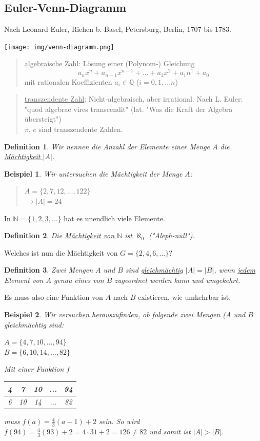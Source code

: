 \documentclass{report}
\newtheorem{mydef}{Definition}
\newtheorem{myexample}{Beispiel}
\begin{document}
\subsection{Euler-Venn-Diagramm}
Nach Leonard Euler, Riehen b. Basel, Petersburg, Berlin, 1707 bis 1783.
\begin{center}\texttt{[image: img/venn-diagramm.png]}\end{center}
\begin{quote}\underline{algebraische Zahl}: Lösung einer (Polynom-) Gleichung \begin{equation}
a_nx^n + a_{n-1}x^{n-1} + ... + a_2x^2 + a_1n^1 + a_0\end{equation}
mit rationalen Koeffizienten $a_i \in \mathbb{Q}$ ($i = 0,1,...n$)\end{quote}
\begin{quote}\underline{transzendente Zahl}: Nicht-algebraisch, aber irrational. Nach L. Euler: "quod algebrae vires transcendit" (lat. "Was die Kraft der Algebra übersteigt")\\
$\pi$, $e$ sind transzendente Zahlen.\end{quote}
\begin{mydef}Wir nennen die Anzahl der Elemente einer Menge $A$ die \underline{Mächtigkeit $|A|$}. \end{mydef}
\begin{myexample}Wir untersuchen die Mächtigkeit der Menge $A$:
\begin{quote}$A = \{2, 7, 12, ..., 122\}$\\
$\to |A| = 24$\end{quote}\end{myexample}
In $\mathbb{N} = \{1, 2, 3, ... \}$ hat es unendlich viele Elemente.
\begin{mydef} Die \underline{Mächtigkeit von $\mathbb{N}$} ist $\aleph_0$ ("Aleph-null").\end{mydef}
Welches ist nun die Mächtigkeit von $G = \{2, 4, 6, ...\}$?
\begin{mydef}Zwei Mengen $A$ und $B$ sind \underline{gleichmächtig} $|A| = |B|$, wenn \underline{jedem} Element von $A$ genau eines von $B$ zugeordnet werden kann und umgekehrt.\end{mydef}
Es muss also eine Funktion von $A$ nach $B$ existieren, wie umkehrbar ist.
\begin{myexample}Wir versuchen herauszufinden, ob folgende zwei Mengen ($A$ und $B$ gleichmächtig sind:\begin{center}
$A = \{4, 7, 10, ..., 94\}$\\
$B = \{6, 10, 14, ..., 82\}$\end{center}
Mit einer Funktion $f$\\
\begin{center}\begin{tabular}{c | c | c | c | c}4 & 7 & 10 & ... & 94\\ \hline
6 & 10 & 14 & ... & 82\end{tabular}\end{center}
muss $f(a) = \frac{4}{3}(a-1)+2$ sein.
So wird $f(94) = \frac{4}{3}(93)+2 = 4 \cdot 31 + 2 = 126 \neq 82$ und somit ist $|A| > |B|$.\end{myexample}
\end{document}
